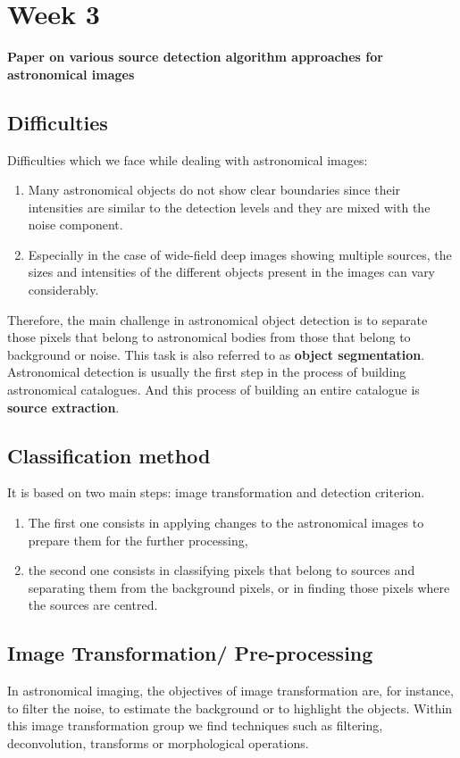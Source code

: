 \documentclass{article}
\begin{document}
\section{Week 3}
\textbf{\large Paper on various source detection algorithm approaches for astronomical images}
\subsection{Difficulties}
Difficulties which we face while dealing with astronomical images:
\begin{enumerate}
    \item Many astronomical objects do not show clear boundaries since their intensities are similar to the detection levels and they are mixed with the noise component.
    \item Especially in the case of wide-field deep images showing multiple sources, the sizes and intensities of the different objects present in the images can vary considerably.
\end{enumerate}
Therefore, the main challenge in astronomical object detection
is to separate those pixels that belong to astronomical bodies from
those that belong to background or noise. This task is also referred to as \textbf{object segmentation}. \\
Astronomical detection is usually the first step in the process of building astronomical catalogues. And this process of building an entire catalogue is \textbf{source extraction}.
\subsection{Classification method} 
It is based on two main steps: image transformation and detection criterion. 
\begin{enumerate}
    \item The first one consists in applying changes to the astronomical images to prepare them for the further processing,
    \item the second one consists in classifying pixels that belong to sources and separating them from the background pixels, or in finding those pixels where the sources are centred. 
\end{enumerate}

\subsection{Image Transformation/ Pre-processing}
In astronomical imaging, the objectives of image transformation are, for instance, to filter the noise, to estimate the background or to highlight the objects. Within this image transformation group we find techniques such
as filtering, deconvolution, transforms or morphological operations.
\end{document}

